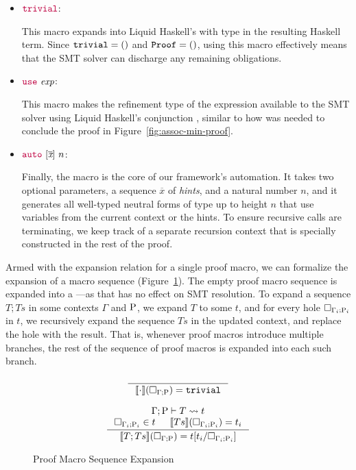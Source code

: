 \begin{itemize}

\item ${\color{purple}\mathtt{trivial}}$:

  This macro expands into Liquid Haskell's  with type
   in the resulting Haskell term. Since $\mathtt{trivial} =
  \mathtt{()}$ and $\mathtt{Proof} = \mathtt{()}$, using this macro effectively
  means that the SMT solver can discharge any remaining obligations.

\item ${\color{purple}\mathtt{use}} ~ \textit{exp}$:

  This macro makes the refinement type of the expression available to
  the SMT solver using Liquid Haskell's conjunction \LC{&&&}, similar
  to how  was needed to conclude the proof in
  Figure~\ref{fig:assoc-min-proof}.
  
\item ${\color{purple}\mathtt{auto}} ~ [\overline{\textit{x}}] ~ n$:

  Finally, the  macro is the core of our framework's
  automation.  It takes two optional parameters, a sequence
  $\overline{\textit{x}}$ of {\em hints}, and a natural number $n$,
  and it generates all well-typed neutral forms of type  up
  to height $n$ that use variables from the current context or the
  hints. To ensure recursive calls are terminating, we keep track of a
  separate recursion context that is specially constructed in the rest
  of the proof.
\end{itemize}

Armed with the expansion relation for a single proof macro, we can
formalize the expansion of a macro sequence
(Figure~\ref{fig:sequence-semantics}). The empty proof macro sequence
is expanded into a ---as that has no effect on SMT
resolution. To expand a sequence $T; Ts$ in some contexts $\Gamma$ and
$\mathrm{P}$, we expand $T$ to some \LangBTerm $t$, and for every hole
$\Box_{\Gamma_i ; \mathrm{P}_i}$ in $t$, we recursively expand the
sequence $Ts$ in the updated context, and replace the hole with the
result.  That is, whenever proof macros introduce multiple branches,
the rest of the sequence of proof macros is expanded into each such
branch.

\begin{figure}
  \[
  \begin{array}{c}
  \inference{}{\Sem{\cdot}{\macroHole{\Gamma}{\Rho}}{\MC{trivial}}}\\
\\    
  \inference
      { \Expand{\Gamma}{\Rho}{T}{t}\\
            \macroHole{\Gamma_i}{\Rho_i} \in t && 
            \Sem{Ts}{\macroHole{\Gamma_i}{\Rho_i}}{t_i}
          }
      { \Sem{T;Ts}{\macroHole{\Gamma}{\Rho}}{t[t_i/\macroHole{\Gamma_i}{\Rho_i}]}}
  \end{array}
  \]
  \caption{Proof Macro Sequence Expansion}
  \label{fig:sequence-semantics}
\end{figure}

